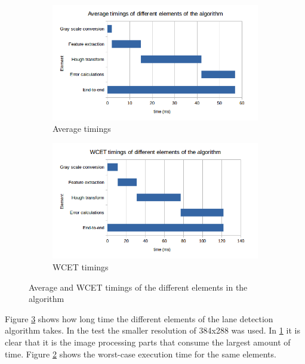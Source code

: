 \begin{figure}[H]
  \begin{subfigure}[b]{\textwidth}
    \includegraphics[width=1\linewidth]{./img/AVERAGE_timings_2.png}
    \caption{\label{fig:Average timings}Average timings}
  \end{subfigure}
  \begin{subfigure}[b]{\textwidth}
    \includegraphics[width=1\linewidth]{./img/WCET_timings.png}
    \caption{\label{fig:WCET timings}WCET timings}
  \end{subfigure}
  \caption{\label{fig:Average and WCET timings of the different elements in the algorithm}Average and WCET timings of the different elements in the algorithm}
\end{figure}

Figure \ref{fig:Average and WCET timings of the different elements in the algorithm} shows how long time the different elements of the lane detection algorithm takes. In the test the smaller resolution of 384x288 was used. In \ref{fig:Average timings} it is clear that it is the image processing parts that consume the largest amount of time. Figure \ref{fig:WCET timings} shows the worst-case execution time for the same elements.\\




